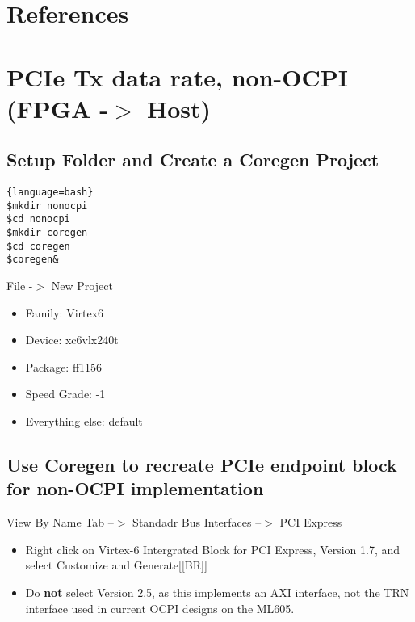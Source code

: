 \newpage

\tableofcontents

\newpage

\listoffigures

\newpage

\listoftables

\newpage

\section{References}


\section{PCIe Tx data rate, non-OCPI (FPGA -$>$ Host)}


\subsection{Setup Folder and Create a Coregen Project}

\begin{lstlisting}{language=bash}
$mkdir nonocpi
$cd nonocpi
$mkdir coregen
$cd coregen
$coregen&
\end{lstlisting}

File -$>$ New Project
\begin{itemize}
\item{Family: Virtex6}
\item{Device: xc6vlx240t}
\item{Package: ff1156}
\item{Speed Grade: -1}
\item{Everything else: default}
\end{itemize}
\subsection{Use Coregen to recreate PCIe endpoint block for non-OCPI implementation}
View By Name Tab --$>$ Standadr Bus Interfaces --$>$ PCI Express
\begin{itemize}

\item Right click on Virtex-6 Intergrated Block for PCI Express, Version 1.7, and select Customize and Generate[[BR]]
\item Do \textbf{not} select Version 2.5, as this implements an AXI interface, not the TRN interface used in current OCPI designs on the ML605.

\end{itemize}

